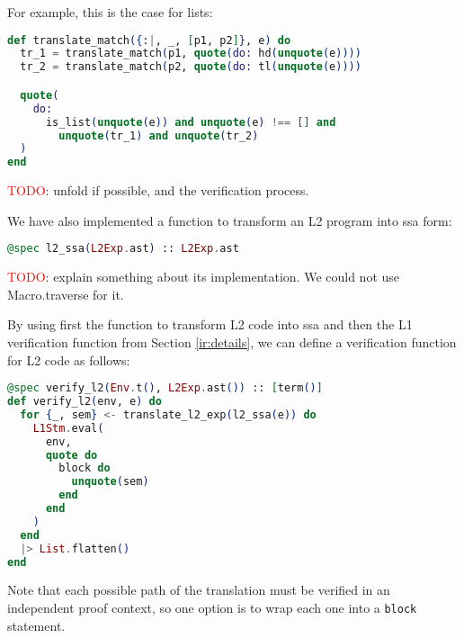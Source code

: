 For example, this is the case for lists:

\begin{lstlisting}[language=elixir,numbers=none,frame=none]
def translate_match({:|, _, [p1, p2]}, e) do
  tr_1 = translate_match(p1, quote(do: hd(unquote(e))))
  tr_2 = translate_match(p2, quote(do: tl(unquote(e))))

  quote(
    do:
      is_list(unquote(e)) and unquote(e) !== [] and
        unquote(tr_1) and unquote(tr_2)
  )
end
\end{lstlisting}

\textcolor{red}{TODO}: unfold if possible, and the verification process.

We have also implemented a function to transform an L2 program into 
\gls{ssa} form:

\begin{lstlisting}[language=elixir,numbers=none,frame=none]
@spec l2_ssa(L2Exp.ast) :: L2Exp.ast
\end{lstlisting}

\textcolor{red}{TODO}: explain something about its implementation. We could
not use Macro.traverse for it.

By using first the function to transform L2 code into \gls{ssa} and then 
the L1 verification function from Section \ref{ir:details}, we can
define a verification function for L2 code as follows:

\begin{lstlisting}[language=elixir,numbers=none,frame=none]
@spec verify_l2(Env.t(), L2Exp.ast()) :: [term()]
def verify_l2(env, e) do
  for {_, sem} <- translate_l2_exp(l2_ssa(e)) do
    L1Stm.eval(
      env,
      quote do
        block do
          unquote(sem)
        end
      end
    )
  end
  |> List.flatten()
end
\end{lstlisting}

Note that each possible path of the translation must be verified in an
independent proof context, so one option is to wrap each one into a \verb|block|
statement.

